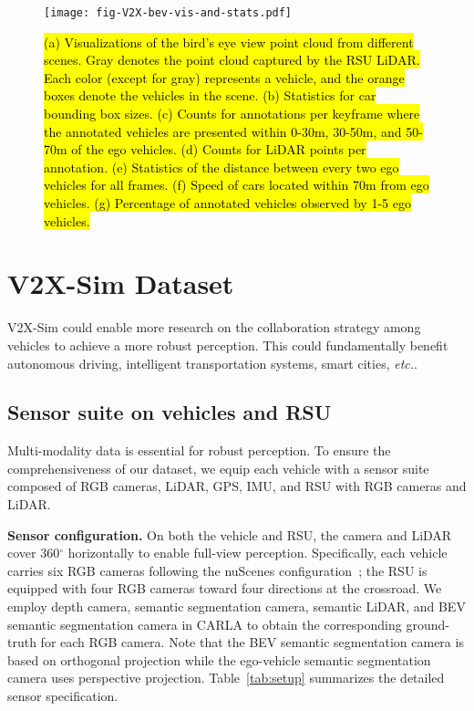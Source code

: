 \begin{figure*}[t]
\begin{center}
\texttt{[image: fig-V2X-bev-vis-and-stats.pdf]}
\vspace{-1mm}
\caption{\hl{(a) Visualizations of the bird's eye view point cloud from different scenes. Gray denotes the point cloud captured by the RSU LiDAR. Each color (except for gray) represents a vehicle, and the orange boxes denote the vehicles in the scene. (b) Statistics for car bounding box sizes. (c) Counts for annotations per keyframe where the annotated vehicles are presented within 0-30m, 30-50m, and 50-70m of the ego vehicles. (d) Counts for LiDAR points per annotation. (e) Statistics of the distance between every two ego vehicles for all frames. (f) Speed of cars located within 70m from ego vehicles. (g) Percentage of annotated vehicles observed by 1-5 ego vehicles.}}
\label{fig:scene}
\end{center}
\vspace{-8mm}
\end{figure*}
\section{V2X-Sim Dataset}
V2X-Sim could enable more research on the collaboration strategy among vehicles to achieve a more robust perception. This could fundamentally benefit autonomous driving, intelligent transportation systems, smart cities, \textit{etc.}.
\subsection{Sensor suite on vehicles and RSU}
Multi-modality data is essential for robust perception. To ensure the comprehensiveness of our dataset, we equip each vehicle with a sensor suite composed of RGB cameras, LiDAR, GPS, IMU, and RSU with RGB cameras and LiDAR. 

\textbf{Sensor configuration.} On both the vehicle and RSU, the camera and LiDAR cover 360$^{\circ}$ horizontally to enable full-view perception. Specifically, each vehicle carries six RGB cameras following the nuScenes configuration~\cite{Caesar2020nuScenesAM}; the RSU is equipped with four RGB cameras toward four directions at the crossroad. We employ depth camera, semantic segmentation camera, semantic LiDAR, and BEV semantic segmentation camera in CARLA to obtain the corresponding ground-truth for each RGB camera. Note that the BEV semantic segmentation camera is based on orthogonal projection while the ego-vehicle semantic segmentation camera uses perspective projection. Table~\ref{tab:setup} summarizes the detailed sensor specification. 

